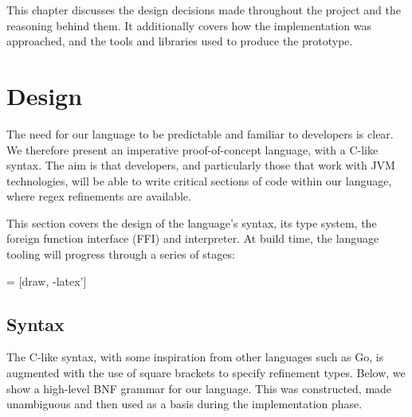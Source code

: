 \documentclass[a4paper,openany,12pt]{book}
\begin{document}
This chapter discusses the design decisions made throughout the project and the reasoning behind them.
It additionally covers how the implementation was approached, and the tools and libraries used to produce the prototype.

\section{Design}

The need for our language to be predictable and familiar to developers is clear.
We therefore present an imperative proof-of-concept language, with a C-like syntax.
The aim is that developers, and particularly those that work with JVM technologies, will be able to write critical
sections of code within our language, where regex refinements are available.

This section covers the design of the language's syntax, its type system, the foreign function interface (FFI) and
interpreter.
At build time, the language tooling will progress through a series of stages:

 = [draw, -latex']



\subsection{Syntax}\label{subsec:syntax}

The C-like syntax, with some inspiration from other languages such as Go, is augmented with the use of square brackets
to specify refinement types.
Below, we show a high-level BNF grammar for our language.
This was constructed, made unambiguous and then used as a basis during the implementation phase.
\end{document}
